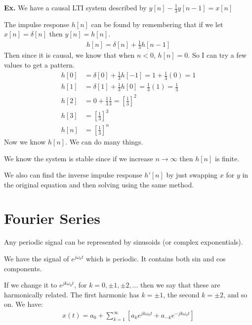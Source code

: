 \documentclass[12pt,letterpaper]{article} \usepackage{amsmath} \usepackage{graphicx} \usepackage[margin=1in]{geometry} \usepackage{longtable}  \usepackage{amssymb}
\begin{document}
	\begin{mdframed}
		\textbf{Ex. } We have a causal LTI system described by $y[n] - \frac{1}{3} y[n-1] = x[n]$
		
		The impulse response $h[n]$ can be found by remembering that if we let $x[n] = \delta[n]$ then $y[n]=h[n]$.
		\begin{align*}
			h[n] = \delta[n] + \frac{1}{3} h[n-1]
		\end{align*}
		Then since it is causal, we know that when $n<0$, $h[n]=0$. So I can try a few values to get a pattern.
		\begin{align*}
			h[0] &= \delta[0] + \frac{1}{3}h[-1] = 1 + \frac{1}{3} (0) = 1\\
			h[1] &= \delta[1] + \frac{1}{3}h[0] = \frac{1}{3} (1) = \frac{1}{3}\\
			h[2] &= 0 + \frac{1}{3} \frac{1}{3} = \left[\frac{1}{3}\right]^2\\
			h[3] &= \left[\frac{1}{3}\right]^3\\
			h[n] &= \left[\frac{1}{3}\right]^n
		\end{align*}
		Now we know $h[n]$. We can do many things. 
		
		We know the system is stable since if we increase $n \to \infty$ then $h[n]$ is finite. 
		
		We also can find the inverse impulse response $h'[n]$ by just swapping $x$ for $y$ in the original equation and then solving using the same method. 
		
	\end{mdframed}
	\section{Fourier Series}
	Any periodic signal can be represented by sinusoids (or complex exponentials).
	
	We have the signal of $e^{j\omega_0t}$ which is periodic. It contains both sin and cos components. 
	
	If we change it to $e^{jk\omega_0 t}$, for $k=0, \pm1, \pm2, ...$ then we say that these are harmonically related. The first harmonic has $k=\pm1$, the second $k=\pm2$, and so on. We have:
	\begin{align}
		x(t) = a_0 + \sum^{\infty}_{k=1} \left[a_k e^{jk\omega_0t} + a_{-k}e^{-jk\omega_0t}\right]
	\end{align}
	
\end{document}
